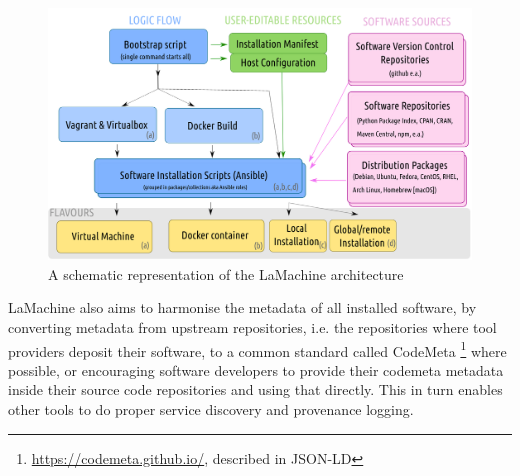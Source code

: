 \documentclass[a4paper,11pt]{article}
\begin{document}
%

\begin{figure}[htb] \begin{center}
\includegraphics[width=135.0mm]{architecture.png}
\end{center}
\caption{\footnotesize{A schematic representation of the LaMachine architecture}}
\label{fig:arch}
\end{figure}

LaMachine also aims to harmonise the metadata of all installed software, by converting metadata from upstream
repositories, i.e. the repositories where tool providers deposit their software, to a common standard called CodeMeta
\footnote{\url{https://codemeta.github.io/}, described in JSON-LD} \cite{codemeta,codemetar} where possible, or
encouraging software developers to provide their codemeta metadata inside their source code repositories and using
that directly. This in turn enables other tools to do proper service discovery and provenance logging.
\end{document}
